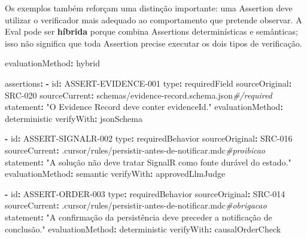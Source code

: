 \documentclass[
  10pt,
  a4paper,
  oneside]{book}
\newenvironment{Shaded}{}{}
\newcommand{\AttributeTok}[1]{\textcolor[rgb]{0.49,0.56,0.16}{#1}}
\newcommand{\CommentTok}[1]{\textcolor[rgb]{0.38,0.63,0.69}{\textit{#1}}}
\newcommand{\FunctionTok}[1]{\textcolor[rgb]{0.02,0.16,0.49}{#1}}
\newcommand{\KeywordTok}[1]{\textcolor[rgb]{0.00,0.44,0.13}{\textbf{#1}}}
\newcommand{\StringTok}[1]{\textcolor[rgb]{0.25,0.44,0.63}{#1}}
\renewenvironment{Shaded}{\begin{snugshade}}{\end{snugshade}}%
\begin{document}
Os exemplos também reforçam uma distinção importante: uma Assertion deve
utilizar o verificador mais adequado ao comportamento que pretende
observar. A Eval pode ser \textbf{híbrida} porque combina Assertions
determinísticas e semânticas; isso não significa que toda Assertion
precise executar os dois tipos de verificação.

\begin{Shaded}
\begin{Highlighting}[]
\FunctionTok{evaluationMethod}\KeywordTok{:}\AttributeTok{ hybrid}

\FunctionTok{assertions}\KeywordTok{:}
\AttributeTok{  }\KeywordTok{{-}}\AttributeTok{ }\FunctionTok{id}\KeywordTok{:}\AttributeTok{ ASSERT{-}EVIDENCE{-}001}
\AttributeTok{    }\FunctionTok{type}\KeywordTok{:}\AttributeTok{ requiredField}
\AttributeTok{    }\FunctionTok{sourceOriginal}\KeywordTok{:}\AttributeTok{ SRC{-}020}
\AttributeTok{    }\FunctionTok{sourceCurrent}\KeywordTok{:}\AttributeTok{ schemas/evidence{-}record.schema.json}\CommentTok{\#/required}
\AttributeTok{    }\FunctionTok{statement}\KeywordTok{:}\AttributeTok{ }\StringTok{"O Evidence Record deve conter evidenceId."}
\AttributeTok{    }\FunctionTok{evaluationMethod}\KeywordTok{:}\AttributeTok{ deterministic}
\AttributeTok{    }\FunctionTok{verifyWith}\KeywordTok{:}\AttributeTok{ jsonSchema}

\AttributeTok{  }\KeywordTok{{-}}\AttributeTok{ }\FunctionTok{id}\KeywordTok{:}\AttributeTok{ ASSERT{-}SIGNALR{-}002}
\AttributeTok{    }\FunctionTok{type}\KeywordTok{:}\AttributeTok{ requiredBehavior}
\AttributeTok{    }\FunctionTok{sourceOriginal}\KeywordTok{:}\AttributeTok{ SRC{-}016}
\AttributeTok{    }\FunctionTok{sourceCurrent}\KeywordTok{:}\AttributeTok{ .cursor/rules/persistir{-}antes{-}de{-}notificar.mdc}\CommentTok{\#proibicao}
\AttributeTok{    }\FunctionTok{statement}\KeywordTok{:}\AttributeTok{ }\StringTok{"A solução não deve tratar SignalR como fonte durável do estado."}
\AttributeTok{    }\FunctionTok{evaluationMethod}\KeywordTok{:}\AttributeTok{ semantic}
\AttributeTok{    }\FunctionTok{verifyWith}\KeywordTok{:}\AttributeTok{ approvedLlmJudge}

\AttributeTok{  }\KeywordTok{{-}}\AttributeTok{ }\FunctionTok{id}\KeywordTok{:}\AttributeTok{ ASSERT{-}ORDER{-}003}
\AttributeTok{    }\FunctionTok{type}\KeywordTok{:}\AttributeTok{ requiredBehavior}
\AttributeTok{    }\FunctionTok{sourceOriginal}\KeywordTok{:}\AttributeTok{ SRC{-}014}
\AttributeTok{    }\FunctionTok{sourceCurrent}\KeywordTok{:}\AttributeTok{ .cursor/rules/persistir{-}antes{-}de{-}notificar.mdc}\CommentTok{\#obrigacao}
\AttributeTok{    }\FunctionTok{statement}\KeywordTok{:}\AttributeTok{ }\StringTok{"A confirmação da persistência deve preceder a notificação de conclusão."}
\AttributeTok{    }\FunctionTok{evaluationMethod}\KeywordTok{:}\AttributeTok{ deterministic}
\AttributeTok{    }\FunctionTok{verifyWith}\KeywordTok{:}\AttributeTok{ causalOrderCheck}
\end{Highlighting}
\end{Shaded}
\end{document}
